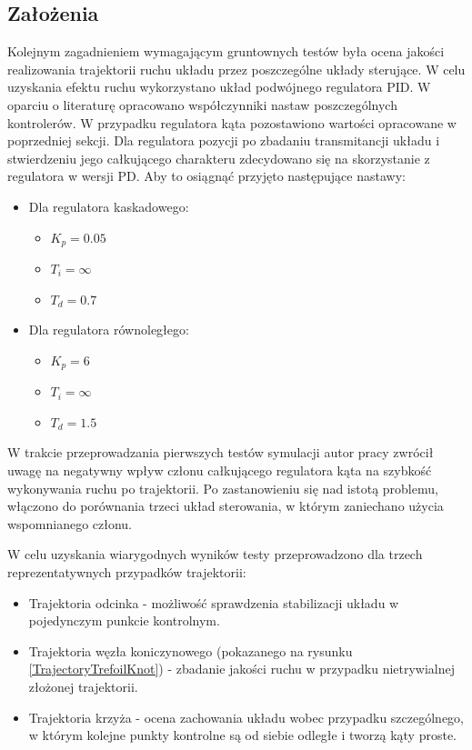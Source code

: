 \documentclass[12pt, oneside]{report}
\theoremstyle{definition}
\begin{document}
\subsection{Założenia}
\label{Reqs}
Kolejnym zagadnieniem wymagającym gruntownych testów była ocena jakości realizowania trajektorii ruchu układu przez poszczególne układy sterujące. W celu uzyskania efektu ruchu wykorzystano układ podwójnego regulatora PID. W oparciu o literaturę opracowano współczynniki nastaw poszczególnych kontrolerów. W przypadku regulatora kąta pozostawiono wartości opracowane w poprzedniej sekcji. Dla regulatora pozycji po zbadaniu transmitancji układu i stwierdzeniu jego całkującego charakteru zdecydowano się na skorzystanie z regulatora w wersji PD. Aby to osiągnąć przyjęto następujące nastawy:
\begin{itemize}
\item Dla regulatora kaskadowego:
\begin{itemize}
\item $K_p = 0.05$
\item $T_i = \infty$
\item $T_d = 0.7$
\end{itemize}
\item Dla regulatora równoległego:
\begin{itemize}
\item $K_p = 6$
\item $T_i = \infty$
\item $T_d = 1.5$
\end{itemize}
\end{itemize}

W trakcie przeprowadzania pierwszych testów symulacji autor pracy zwrócił uwagę na negatywny wpływ członu całkującego regulatora kąta na szybkość wykonywania ruchu po trajektorii. Po zastanowieniu się nad istotą problemu, włączono do porównania trzeci układ sterowania, w którym zaniechano użycia wspomnianego członu.


W celu uzyskania wiarygodnych wyników testy przeprowadzono dla trzech reprezentatywnych przypadków trajektorii:
\begin{itemize}
\item Trajektoria odcinka - możliwość sprawdzenia stabilizacji układu w pojedynczym punkcie kontrolnym.
\item Trajektoria węzła koniczynowego (pokazanego na rysunku \ref{TrajectoryTrefoilKnot}) - zbadanie jakości ruchu w przypadku nietrywialnej złożonej trajektorii.
\item Trajektoria krzyża - ocena zachowania układu wobec przypadku szczególnego, w którym kolejne punkty kontrolne są od siebie odległe i tworzą kąty proste.
\end{itemize}
\end{document}
